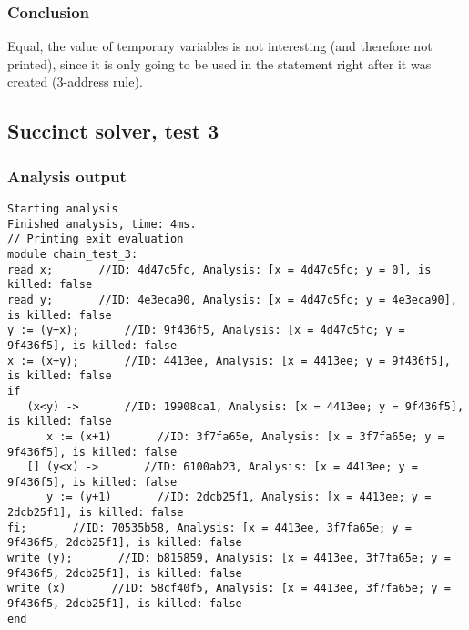 \subsubsection{Conclusion}
Equal, the value of temporary variables is not interesting (and therefore not printed), since it is only going to be used in the statement right after it was created (3-address rule).

\subsection{Succinct solver, test 3}
\subsubsection{Analysis output}
\begin{lstlisting}
Starting analysis
Finished analysis, time: 4ms.
// Printing exit evaluation
module chain_test_3:
read x;       //ID: 4d47c5fc, Analysis: [x = 4d47c5fc; y = 0], is killed: false
read y;       //ID: 4e3eca90, Analysis: [x = 4d47c5fc; y = 4e3eca90], is killed: false
y := (y+x);       //ID: 9f436f5, Analysis: [x = 4d47c5fc; y = 9f436f5], is killed: false
x := (x+y);       //ID: 4413ee, Analysis: [x = 4413ee; y = 9f436f5], is killed: false
if
   (x<y) ->       //ID: 19908ca1, Analysis: [x = 4413ee; y = 9f436f5], is killed: false
      x := (x+1)       //ID: 3f7fa65e, Analysis: [x = 3f7fa65e; y = 9f436f5], is killed: false
   [] (y<x) ->       //ID: 6100ab23, Analysis: [x = 4413ee; y = 9f436f5], is killed: false
      y := (y+1)       //ID: 2dcb25f1, Analysis: [x = 4413ee; y = 2dcb25f1], is killed: false
fi;       //ID: 70535b58, Analysis: [x = 4413ee, 3f7fa65e; y = 9f436f5, 2dcb25f1], is killed: false
write (y);       //ID: b815859, Analysis: [x = 4413ee, 3f7fa65e; y = 9f436f5, 2dcb25f1], is killed: false
write (x)       //ID: 58cf40f5, Analysis: [x = 4413ee, 3f7fa65e; y = 9f436f5, 2dcb25f1], is killed: false
end
\end{lstlisting}
